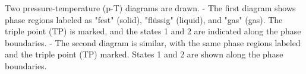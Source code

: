 Two pressure-temperature (p-T) diagrams are drawn.  
- The first diagram shows phase regions labeled as "fest" (solid), "flüssig" (liquid), and "gas" (gas). The triple point (TP) is marked, and the states 1 and 2 are indicated along the phase boundaries.  
- The second diagram is similar, with the same phase regions labeled and the triple point (TP) marked. States 1 and 2 are shown along the phase boundaries.